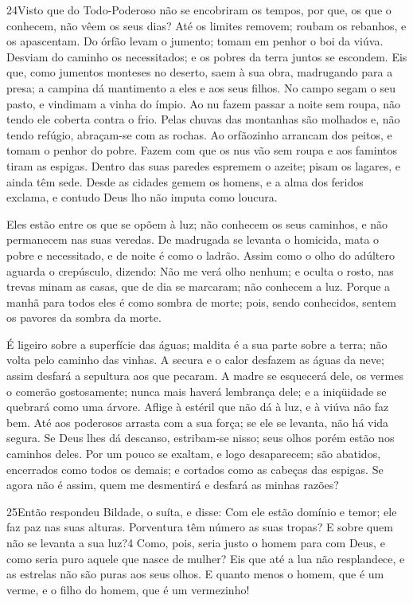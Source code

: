 \medskip

\lettrine{24} Visto que do Todo-Poderoso não se encobriram os
tempos, por que, os que o conhecem, não vêem os seus dias? Até
os limites removem; roubam os rebanhos, e os apascentam. Do
órfão levam o jumento; tomam em penhor o boi da viúva. Desviam
do caminho os necessitados; e os pobres da terra juntos se escondem.
Eis que, como jumentos monteses no deserto, saem à sua obra,
madrugando para a presa; a campina dá mantimento a eles e aos seus
filhos. No campo segam o seu pasto, e vindimam a vinha do ímpio.
Ao nu fazem passar a noite sem roupa, não tendo ele coberta
contra o frio. Pelas chuvas das montanhas são molhados e, não
tendo refúgio, abraçam-se com as rochas. Ao orfãozinho arrancam
dos peitos, e tomam o penhor do pobre. Fazem com que os nus
vão sem roupa e aos famintos tiram as espigas. Dentro das
suas paredes espremem o azeite; pisam os lagares, e ainda têm sede.
Desde as cidades gemem os homens, e a alma dos feridos
exclama, e contudo Deus lho não imputa como loucura.

Eles estão entre os que se opõem à luz; não conhecem os seus
caminhos, e não permanecem nas suas veredas. De madrugada se
levanta o homicida, mata o pobre e necessitado, e de noite é como o
ladrão. Assim como o olho do adúltero aguarda o crepúsculo,
dizendo: Não me verá olho nenhum; e oculta o rosto, nas
trevas minam as casas, que de dia se marcaram; não conhecem a luz.
Porque a manhã para todos eles é como sombra de morte; pois,
sendo conhecidos, sentem os pavores da sombra da morte.

É ligeiro sobre a superfície das águas; maldita é a sua parte
sobre a terra; não volta pelo caminho das vinhas. A secura e
o calor desfazem as águas da neve; assim desfará a sepultura aos que
pecaram. A madre se esquecerá dele, os vermes o comerão
gostosamente; nunca mais haverá lembrança dele; e a iniqüidade se
quebrará como uma árvore. Aflige à estéril que não dá à luz,
e à viúva não faz bem. Até aos poderosos arrasta com a sua
força; se ele se levanta, não há vida segura. Se Deus lhes dá
descanso, estribam-se nisso; seus olhos porém estão nos caminhos
deles. Por um pouco se exaltam, e logo desaparecem; são
abatidos, encerrados como todos os demais; e cortados como as
cabeças das espigas. Se agora não é assim, quem me desmentirá
e desfará as minhas razões?

\medskip

\lettrine{25} Então respondeu Bildade, o suíta, e disse:
Com ele estão domínio e temor; ele faz paz nas suas alturas.
Porventura têm número as suas tropas? E sobre quem não se
levanta a sua luz?4 Como, pois, seria justo o homem para com Deus, e
como seria puro aquele que nasce de mulher? Eis que até a lua
não resplandece, e as estrelas não são puras aos seus olhos. E
quanto menos o homem, que é um verme, e o filho do homem, que é um
vermezinho!


